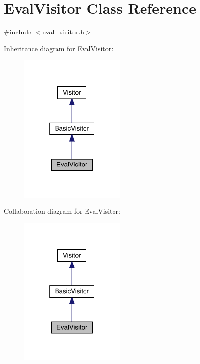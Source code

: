 \hypertarget{class_eval_visitor}{}\section{Eval\+Visitor Class Reference}
\label{class_eval_visitor}


{\ttfamily \#include $<$eval\+\_\+visitor.\+h$>$}



Inheritance diagram for Eval\+Visitor\+:
\nopagebreak
\begin{figure}[H]
\begin{center}
\leavevmode
\includegraphics[width=148pt]{class_eval_visitor__inherit__graph}
\end{center}
\end{figure}


Collaboration diagram for Eval\+Visitor\+:
\nopagebreak
\begin{figure}[H]
\begin{center}
\leavevmode
\includegraphics[width=148pt]{class_eval_visitor__coll__graph}
\end{center}
\end{figure}
